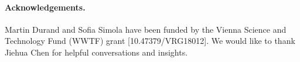 \documentclass[a4paper,fleqn]{cas-sc}
\begin{document}
\paragraph*{Acknowledgements.}
Martin Durand and Sofia Simola have been funded by the Vienna Science and Technology Fund (WWTF) grant [10.47379/VRG18012].
We would like to thank Jiehua Chen for helpful conversations and insights.



 






\begin{appendix}
\newpage
\appendixtext
\end{appendix}
\end{document}
